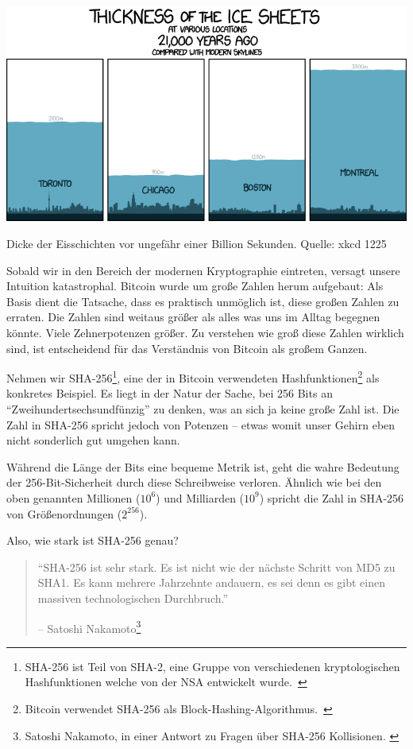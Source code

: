 \begin{center}
  \includegraphics[width=\textwidth]{assets/images/xkcd-1225.png}
  \caption{Dicke der Eisschichten vor ungefähr einer Billion Sekunden. Quelle: xkcd 1225}
  \label{fig:xkcd-1225}
\end{center}

Sobald wir in den Bereich der modernen Kryptographie eintreten, versagt unsere
Intuition katastrophal. Bitcoin wurde um große Zahlen herum aufgebaut: Als Basis dient
die Tatsache, dass es praktisch unmöglich ist, diese großen Zahlen zu erraten. Die Zahlen sind
weitaus größer als alles was uns im Alltag begegnen könnte. Viele Zehnerpotenzen
größer. Zu verstehen wie groß diese Zahlen wirklich sind, ist entscheidend für
das Verständnis von Bitcoin als großem Ganzen.

Nehmen wir SHA-256\footnote{SHA-256 ist Teil von SHA-2, eine Gruppe von
verschiedenen kryptologischen Hashfunktionen welche von der NSA entwickelt
wurde.~\cite{wiki:sha2}}, eine der in Bitcoin verwendeten
Hashfunktionen\footnote{Bitcoin verwendet SHA-256 als
Block-Hashing-Algorithmus.~\cite{btcwiki:block-hashing}} als konkretes Beispiel.
Es liegt in der Natur der Sache, bei 256 Bits an
\enquote{Zweihundertsechsundfünzig} zu denken, was an sich ja keine große Zahl
ist. Die Zahl in SHA-256 spricht jedoch von Potenzen -- etwas womit unser Gehirn
eben nicht sonderlich gut umgehen kann.

Während die Länge der Bits eine bequeme Metrik ist, geht die wahre Bedeutung der
256-Bit-Sicherheit durch diese Schreibweise verloren. Ähnlich wie bei den oben
genannten Millionen ($10^6$) und Milliarden ($10^9$) spricht die Zahl in SHA-256
von Größenordnungen ($2^{256}$).

Also, wie stark ist SHA-256 genau?

\begin{quotation}\begin{samepage}
\enquote{SHA-256 ist sehr stark. Es ist nicht wie der nächste Schritt von MD5 zu
SHA1. Es kann mehrere Jahrzehnte andauern, es sei denn es gibt einen massiven
technologischen Durchbruch.}
\begin{flushright} -- Satoshi Nakamoto\footnote{Satoshi Nakamoto, in einer
Antwort zu Fragen über SHA-256 Kollisionen. \cite{satoshi-sha256}}
\end{flushright}\end{samepage}\end{quotation}

